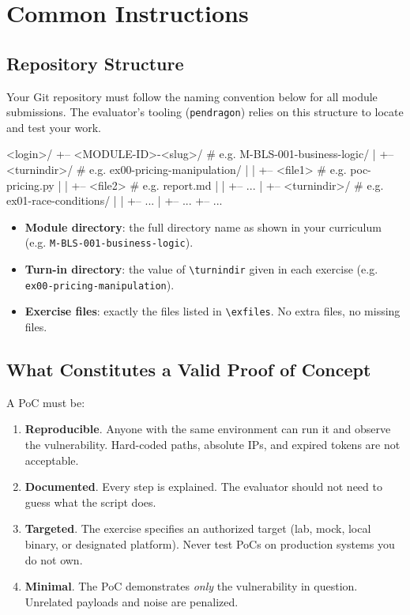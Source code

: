 \chapter{Common Instructions}

\section{Repository Structure}

Your Git repository must follow the naming convention below for
all module submissions. The evaluator's tooling (\texttt{pendragon})
relies on this structure to locate and test your work.

\begin{console}
<login>/
+-- <MODULE-ID>-<slug>/         # e.g. M-BLS-001-business-logic/
|   +-- <turnindir>/            # e.g. ex00-pricing-manipulation/
|   |   +-- <file1>             # e.g. poc-pricing.py
|   |   +-- <file2>             # e.g. report.md
|   |   +-- ...
|   +-- <turnindir>/            # e.g. ex01-race-conditions/
|   |   +-- ...
|   +-- ...
+-- ...
\end{console}

\begin{itemize}
  \item \textbf{Module directory}: the full directory name as shown in your
        curriculum (e.g. \texttt{M-BLS-001-business-logic}).
  \item \textbf{Turn-in directory}: the value of \texttt{\textbackslash turnindir}
        given in each exercise (e.g. \texttt{ex00-pricing-manipulation}).
  \item \textbf{Exercise files}: exactly the files listed in
        \texttt{\textbackslash exfiles}. No extra files, no missing files.
\end{itemize}

\section{What Constitutes a Valid Proof of Concept}

A PoC must be:

\begin{enumerate}
  \item \textbf{Reproducible}. Anyone with the same environment can run it
        and observe the vulnerability. Hard-coded paths, absolute IPs, and
        expired tokens are not acceptable.
  \item \textbf{Documented}. Every step is explained. The evaluator should
        not need to guess what the script does.
  \item \textbf{Targeted}. The exercise specifies an authorized target
        (lab, mock, local binary, or designated platform). Never test PoCs
        on production systems you do not own.
  \item \textbf{Minimal}. The PoC demonstrates \emph{only} the vulnerability
        in question. Unrelated payloads and noise are penalized.
\end{enumerate}

